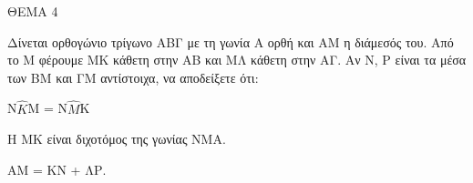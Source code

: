 
ΘΕΜΑ 4

Δίνεται ορθογώνιο τρίγωνο ΑΒΓ με τη γωνία Α ορθή και ΑΜ η διάμεσός του. Από το Μ φέρουμε ΜΚ κάθετη στην ΑΒ και ΜΛ κάθετη στην ΑΓ. Αν Ν, Ρ είναι τα μέσα των ΒΜ και ΓΜ αντίστοιχα, να αποδείξετε ότι:

\begin{alist}
\item N$\widehat{K}$M = N$\widehat{M}$K 

\item Η ΜΚ είναι διχοτόμος της γωνίας ΝΜΑ. 

\item ΑΜ = ΚΝ + ΛΡ. 
\end{alist}
